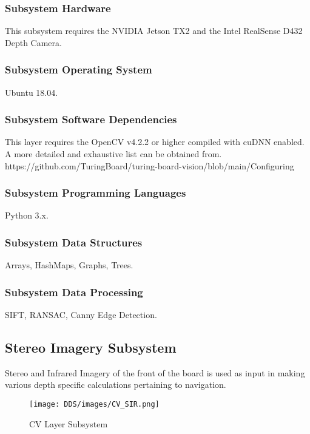 \subsubsection{Subsystem Hardware}
This subsystem requires the NVIDIA Jetson TX2 and the Intel RealSense  D432 Depth Camera.

\subsubsection{Subsystem Operating System}
Ubuntu 18.04.  

\subsubsection{Subsystem Software Dependencies}
This layer requires the OpenCV v4.2.2 or higher compiled with cuDNN enabled. A more detailed and exhaustive list can be obtained from. https://github.com/TuringBoard/turing-board-vision/blob/main/Configuring%


\subsubsection{Subsystem Programming Languages}
Python 3.x.

\subsubsection{Subsystem Data Structures}
Arrays, HashMaps, Graphs, Trees.

\subsubsection{Subsystem Data Processing}
SIFT, RANSAC, Canny Edge Detection.







\subsection{Stereo Imagery Subsystem}
Stereo and Infrared Imagery of the front of the board is used as input in making various depth specific calculations pertaining to navigation.

\begin{figure}[h!]
	\centering
 	\texttt{[image: DDS/images/CV\_SIR.png]} %
 \caption{CV Layer Subsystem} %
\end{figure}

